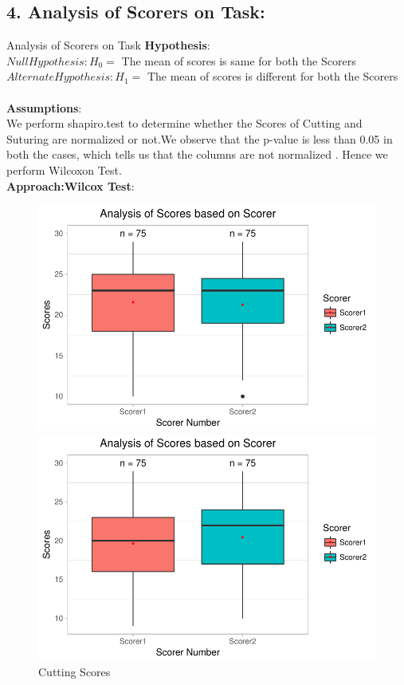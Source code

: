 \documentclass[12pt,epsf]{report}
\begin{document}
{\subsection*{4. Analysis of Scorers on Task:}
 {Analysis of Scorers on Task}
\textbf{Hypothesis}:\\
$Null Hypothesis : H_0 = $ The mean of scores is same for both the Scorers\\
$Alternate Hypothesis : H_1 = $ The  mean of scores is different for both the Scorers\\
\\
\textbf{Assumptions}:\\
We perform shapiro.test to determine whether the Scores of Cutting and Suturing are normalized or not.We observe that the p-value is less than 0.05 in both the cases, which tells us that the columns are not normalized . Hence we perform Wilcoxon Test.\\
\textbf{Approach:Wilcox Test}:\\
\begin{figure}[!htb]
	\begin{minipage}[c]{0.5\linewidth}
	\includegraphics[width=\linewidth]{Cutting_ScorerVsScore.pdf}
	\caption{ Cutting Scores}
	\end{minipage}
	\hfill
	\begin{minipage}[c]{0.5\linewidth}
	\includegraphics[width=\linewidth]{Suturing_ScorerVsScore.pdf}

\end{minipage}
\end{figure}}
\end{document}
